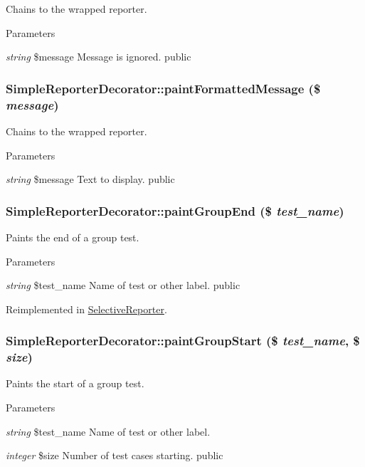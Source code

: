 \label{class_simple_reporter_decorator_a4dd462fa2d69921c1c4994e31df3be21}
Chains to the wrapped reporter. 
\begin{DoxyParams}{Parameters}
\item[{\em string}]\$message Message is ignored.  public \end{DoxyParams}
\hypertarget{class_simple_reporter_decorator_a15ee8be1412a746135526e83b2ba307b}{
\subsubsection[{paintFormattedMessage}]{\setlength{\rightskip}{0pt plus 5cm}SimpleReporterDecorator::paintFormattedMessage (\$ {\em message})}}
\label{class_simple_reporter_decorator_a15ee8be1412a746135526e83b2ba307b}
Chains to the wrapped reporter. 
\begin{DoxyParams}{Parameters}
\item[{\em string}]\$message Text to display.  public \end{DoxyParams}
\hypertarget{class_simple_reporter_decorator_a836e0cd11187140b1646bcd1fee494d1}{
\subsubsection[{paintGroupEnd}]{\setlength{\rightskip}{0pt plus 5cm}SimpleReporterDecorator::paintGroupEnd (\$ {\em test\_\-name})}}
\label{class_simple_reporter_decorator_a836e0cd11187140b1646bcd1fee494d1}
Paints the end of a group test. 
\begin{DoxyParams}{Parameters}
\item[{\em string}]\$test\_\-name Name of test or other label.  public \end{DoxyParams}


Reimplemented in \hyperlink{class_selective_reporter_a3d49dee3f9831508049c46b3f8bc48e1}{SelectiveReporter}.\hypertarget{class_simple_reporter_decorator_a2e64b5bc09764a866715f80c3f2aeee7}{
\subsubsection[{paintGroupStart}]{\setlength{\rightskip}{0pt plus 5cm}SimpleReporterDecorator::paintGroupStart (\$ {\em test\_\-name}, \/  \$ {\em size})}}
\label{class_simple_reporter_decorator_a2e64b5bc09764a866715f80c3f2aeee7}
Paints the start of a group test. 
\begin{DoxyParams}{Parameters}
\item[{\em string}]\$test\_\-name Name of test or other label. \item[{\em integer}]\$size Number of test cases starting.  public \end{DoxyParams}


